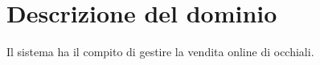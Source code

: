 \section{Descrizione del dominio}
Il sistema ha il compito di gestire la vendita online di occhiali.